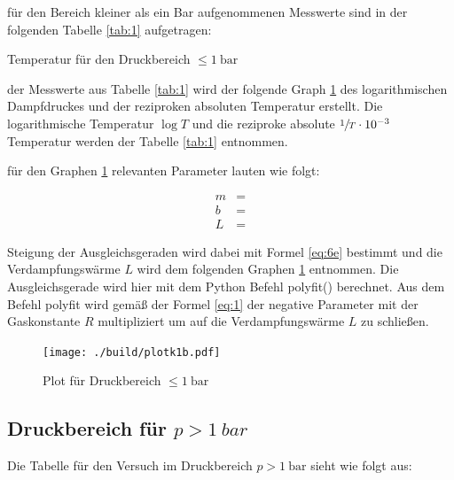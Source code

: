 \justifying für den Bereich kleiner als ein Bar aufgenommenen Messwerte sind in der folgenden Tabelle \ref{tab:1} aufgetragen:

\begin{table}
    \centering
    
    \caption{Temperatur für den Druckbereich $\leq \SI{1}{\bar}$}
    \label{tab:1}
\end{table}

\justifying der Messwerte aus Tabelle \ref{tab:1} wird der folgende Graph \ref{fig:4} des logarithmischen Dampfdruckes und
der reziproken absoluten Temperatur erstellt. Die logarithmische Temperatur $\log{T}$ und die reziproke absolute $\sfrac{1}{T} \cdot 10^{-3}$ 
Temperatur werden der Tabelle \ref{tab:1} entnommen.
\newpage

\justifying für den Graphen \ref{fig:4} relevanten Parameter lauten wie folgt:

\begin{subequations} \label{eq:7}
\begin{align}
    m &= \text{} \label{eq:7a}\\
    b &= \text{} \label{eq:7b}\\
    L &= \text{} \label{eq:7c}
\end{align}
\end{subequations}

\justifying Steigung der Ausgleichsgeraden wird dabei mit Formel \eqref{eq:6e} bestimmt und die Verdampfungswärme $L$ wird dem 
folgenden Graphen \ref{fig:4} entnommen. Die Ausgleichsgerade wird hier mit dem Python Befehl polyfit() \cite{uncertainties} berechnet. Aus dem
Befehl polyfit wird gemäß der Formel \eqref{eq:1} der negative Parameter mit der Gaskonstante $R$ multipliziert um auf die Verdampfungswärme $L$ 
zu schließen.

\begin{figure}[H]
    \centering
    \texttt{[image: ./build/plotk1b.pdf]}
    \caption{Plot für Druckbereich $\leq \SI{1}{\bar}$}
    \label{fig:4}
\end{figure}

\subsection{Druckbereich für $p > \SI{1}{bar}$}

Die Tabelle für den Versuch im Druckbereich $p> \SI{1}{\bar} $ sieht wie folgt aus:

